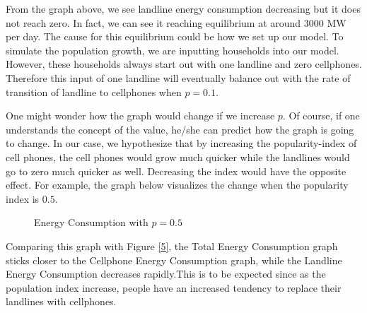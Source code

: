 \documentclass{article}
\begin{document}
From the graph above, we see landline energy consumption decreasing but it does not reach zero. In fact, we can see it reaching equilibrium at around 3000 MW per day. The cause for this equilibrium could be how we set up our model. To simulate the population growth, we are inputting households into our model. However, these households always start out with one landline and zero cellphones. Therefore this input of one landline will eventually balance out with the rate of transition of landline to cellphones when $p = 0.1$. \par
One might wonder how the graph would change if we increase $p$. Of course, if one understands the concept of the value, he/she can predict how the graph is going to change. In our case, we hypothesize that by increasing the popularity-index of cell phones, the cell phones would grow much quicker while the landlines would go to zero much quicker as well. Decreasing the index would have the opposite effect. For example, the graph below visualizes the change when the popularity index is $0.5$.\par

\begin{figure}[!ht]
    \caption{Energy Consumption with $p = 0.5$}
    \label{6}
\end{figure}

Comparing this graph with Figure \ref{5}, the Total Energy Consumption graph sticks closer to the Cellphone Energy Consumption graph, while the Landline Energy Consumption decreases rapidly.This is to be expected since as the population index increase, people have an increased tendency to replace their landlines with cellphones.\par
\end{document}
